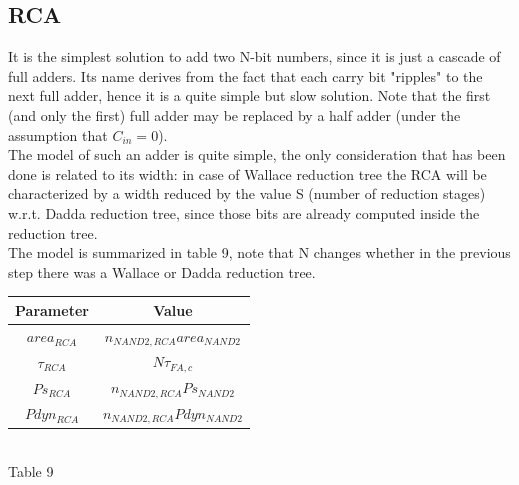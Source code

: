\documentclass[11pt]{article} %
\begin{document}
\subsection{RCA}
It is the simplest solution to add two N-bit numbers, since it is just a cascade of full adders. Its name derives from the fact that each carry bit "ripples" to the next full adder, hence it is a quite simple but slow solution. Note that the first (and only the first) full adder may be replaced by a half adder (under the assumption that $C_{in} = 0$).\\
The model of such an adder is quite simple, the only consideration that has been done is related to its width: in case of Wallace reduction tree the RCA will be characterized by a width reduced by the value S (number of reduction stages) w.r.t. Dadda reduction tree, since those bits are already computed inside the reduction tree.\\
The model is summarized in table 9, note that N changes whether in the previous step there was a Wallace or Dadda reduction tree.
\begin{center}
\begin{tabular}{|c|c|}
	\hline 
            Parameter  & Value \\
	\hline          
	 $area_{RCA}$ & $n_{NAND2, RCA} area_{NAND2} $ \\
	\hline 
	$\tau_{RCA}$ & $N \tau_{FA,c}$ \\
	\hline 
	$Ps_{RCA}$ & $n_{NAND2, RCA} Ps_{NAND2} $  \\
	\hline 
	$Pdyn_{RCA}$ & $n_{NAND2, RCA} Pdyn_{NAND2} $    \\
	\hline 
\end{tabular} \\
\small{Table 9}
\end{center}
\vspace{1em}
\end{document}
